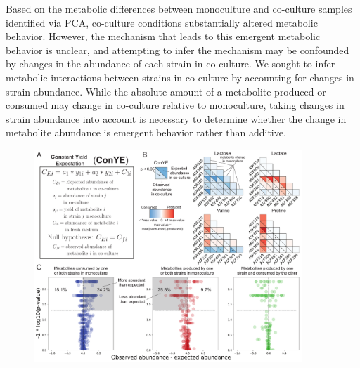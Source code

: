 \documentclass[11pt,twocolumn,notitlepage,openany,twoside]{book}
\begin{document}
\begin{refsection}
Based on the metabolic differences between monoculture and co-culture samples identified via PCA, co-culture conditions substantially altered metabolic behavior. However, the mechanism that leads to this emergent metabolic behavior is unclear, and attempting to infer the mechanism may be confounded by changes in the abundance of each strain in co-culture. We sought to infer metabolic interactions between strains in co-culture by accounting for changes in strain abundance. While the absolute amount of a metabolite produced or consumed may change in co-culture relative to monoculture, taking changes in strain abundance into account is necessary to determine whether the change in metabolite abundance is emergent behavior rather than additive.

\begin{figure}[tb!]
\centering
\includegraphics[width=0.9\textwidth]{ch2_fig4}

\end{figure}
\end{refsection}
\end{document}
